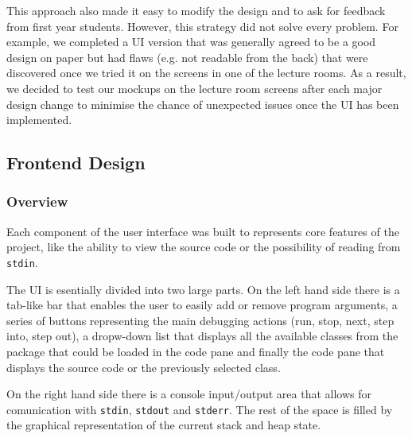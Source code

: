 \documentclass[11pt, a4paper]{article}
\begin{document}
This approach also made it easy to modify the design and to ask for feedback from first year students. 
However, this strategy did not solve every problem.
For example, we completed a UI version that was generally agreed to be a good design on paper but had flaws (e.g. not readable from the back) that were discovered once we tried it on the screens in one of the lecture rooms. 
As a result, we decided to test our mockups on the lecture room screens after each major design change to minimise the chance of unexpected issues once the UI has been implemented.

\subsection{Frontend Design}
\subsubsection{Overview}

Each component of the user interface was built to represents core features of the project, like the ability to view the source code or the possibility of reading from \texttt{stdin}.

The UI is esentially divided into two large parts. 
On the left hand side there is a tab-like bar that enables the user to easily add or remove program arguments, a series of buttons representing the main debugging actions (run, stop, next, step into, step out), a dropw-down list that displays all the available classes from the package that could be loaded in the code pane and finally the code pane that displays the source code or the previously selected class.

On the right hand side there is a console input/output area that allows for comunication with \texttt{stdin}, \texttt{stdout} and \texttt{stderr}. The rest of the space is filled by the graphical representation of the current stack and heap state.
\end{document}

